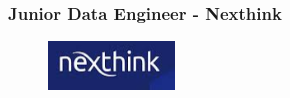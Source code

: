\documentclass[12pt]{article}
\begin{document}
\begin{enumerate}
                \end{enumerate}




            \subsubsection{Junior Data Engineer - Nexthink}

                \begin{figure}[!h]
                    \centering
                    \includegraphics[width=0.3\textwidth]{Recursos/Img/NexthinkLogo.png}
                \end{figure}
\end{document}
